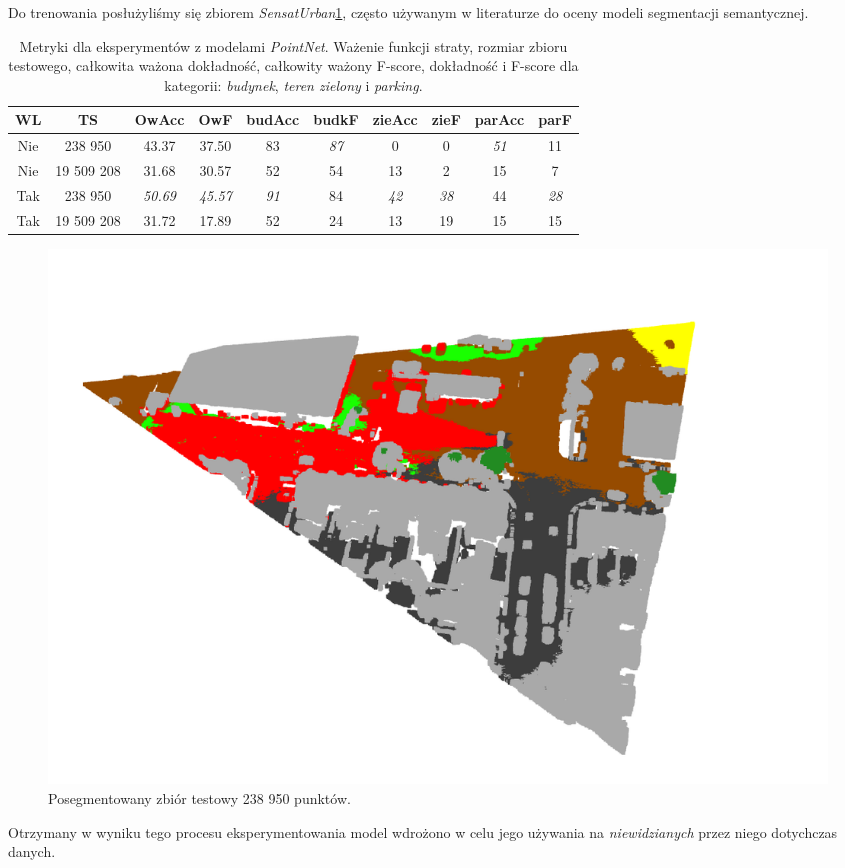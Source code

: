 Do trenowania posłużyliśmy się zbiorem \textit{SensatUrban}\cite{hu2022sensaturban}\ref{fig:seg_bir}, często używanym w literaturze do oceny modeli segmentacji semantycznej.

\begin{table}[!h]
    \centering
    \begin{tabular}{|c|c|c|c|c|c|c|c|c|c|}
    \hline
    WL & TS & OwAcc & OwF & budAcc & budkF & zieAcc & zieF & parAcc & parF \\
    \hline 
    Nie & 238 950 & 43.37 & 37.50 & 83 & \emph{87} & 0 & 0 & \emph{51} & 11 \\
    \hline 
    Nie & 19 509 208 & 31.68 & 30.57 & 52 & 54 & 13 & 2 & 15 & 7 \\
    \hline 
    Tak & 238 950 & \emph{50.69} & \emph{45.57} & \emph{91} & 84 & \emph{42} & \emph{38} & 44 & \emph{28} \\
    \hline
    Tak & 19 509 208 & 31.72 & 17.89 & 52 & 24 & 13 & 19 & 15 & 15 \\
    \hline
    \end{tabular}
\caption{Metryki dla eksperymentów z modelami \textit{PointNet}. Ważenie funkcji straty, rozmiar zbioru testowego, całkowita ważona dokładność, całkowity ważony F-score, dokładność i F-score dla kategorii: \textit{budynek}, \textit{teren zielony} i \textit{parking}.}
\label{table:tab_seg_met}
\end{table}

\begin{figure}[!h]
    \centering
    \includegraphics[width=1.0\linewidth]{images/segmented_birmingham.png}
    \caption{Posegmentowany zbiór testowy 238 950 punktów.}
    \label{fig:seg_bir}
\end{figure}

Otrzymany w wyniku tego procesu eksperymentowania model wdrożono w celu jego używania na \textit{niewidzianych} przez niego dotychczas danych.